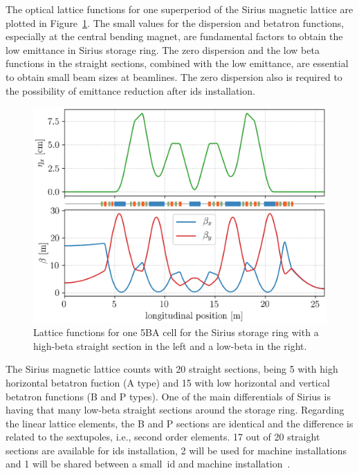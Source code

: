 The optical lattice functions for one superperiod of the Sirius magnetic lattice are plotted in Figure~\ref{fig:twiss_functions}. The small values for the dispersion and betatron functions, especially at the central bending magnet, are fundamental factors to obtain the low emittance in Sirius storage ring. The zero dispersion and the low beta functions in the straight sections, combined with the low emittance, are essential to obtain small beam sizes at beamlines. The zero dispersion also is required to the possibility of emittance reduction after \glspl{id} installation.
\begin{figure}
    \centering
    \includegraphics[width=1.0\textwidth]{figures/twiss_plot_refine_lattice_grid.eps}
    \caption{Lattice functions for one 5BA cell for the Sirius storage ring with a high-beta straight section in the left and a low-beta in the right.}
    \label{fig:twiss_functions}
\end{figure}

The Sirius magnetic lattice counts with 20 straight sections, being 5 with high horizontal betatron fuction (A type) and 15 with low horizontal and vertical betatron functions (B and P types). One of the main differentials of Sirius is having that many low-beta straight sections around the storage ring. Regarding the linear lattice elements, the B and P sections are identical and the difference is related to the sextupoles, i.e., second order elements. 17 out of 20 straight sections are available for \glspl{id} installation, 2 will be used for machine installations and 1 will be shared between a small~\gls{id} and machine installation~\cite{liu2019}. 


